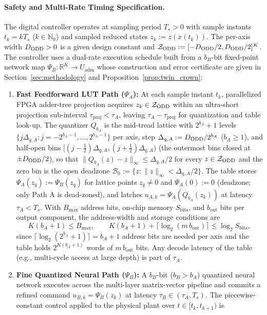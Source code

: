 \paragraph{Safety and Multi-Rate Timing Specification.}
The digital controller operates at sampling period \(T_s > 0\) with sample instants \(t_k = k T_s\) (\(k \in \mathbb{N}_0\)) and sampled reduced states \(z_k := z(x(t_k))\). The per-axis width \(D_{\mathrm{ODD}} > 0\) is a given design constant and \(\mathcal{Z}_{\mathrm{ODD}} := [-D_{\mathrm{ODD}}/2, D_{\mathrm{ODD}}/2]^K\). The controller uses a dual-rate execution schedule built from a \(b_B\)-bit fixed-point network map \(\Psi_B : \mathbb{R}^K \to U_{\mathrm{adm}}\) whose construction and error certificate are given in Section~\ref{sec:methodology} and Proposition~\ref{prop:twin_crown}:
\begin{enumerate}
    \item \textbf{Fast Feedforward LUT Path (\(\Psi_A\)):} At each sample instant \(t_k\), parallelized FPGA adder-tree projection acquires \(z_k \in \mathcal{Z}_{\mathrm{ODD}}\) within an ultra-short projection sub-interval \(\tau_{\mathrm{proj}} < \tau_A\), leaving \(\tau_A - \tau_{\mathrm{proj}}\) for quantization and table look-up. The quantizer \(Q_{b_A}\) is the mid-tread lattice with \(2^{b_A}+1\) levels \(\{j\Delta_{q,A} : j = -2^{b_A-1}, \dots, 2^{b_A-1}\}\) per axis, step \(\Delta_{q,A} := D_{\mathrm{ODD}}/2^{b_A}\) (\(b_A \ge 1\)), and half-open bins \([ (j-\tfrac12)\Delta_{q,A}, (j+\tfrac12)\Delta_{q,A})\) (the outermost bins closed at \(\pm D_{\mathrm{ODD}}/2\)), so that \(\|Q_{b_A}(z) - z\|_\infty \le \Delta_{q,A}/2\) for every \(z \in \mathcal{Z}_{\mathrm{ODD}}\) and the zero bin is the open deadzone \(\mathcal{B}_0 := \{z : \|z\|_\infty < \Delta_{q,A}/2\}\). The table stores \(\Psi_A(z_q) := \Psi_B(z_q)\) for lattice points \(z_q \neq 0\) and \(\Psi_A(0) := 0\) (deadzone; only Path A is dead-zoned), and latches \(u_{A,k} = \Psi_A(Q_{b_A}(z_k))\) at latency \(\tau_A < T_s\). With \(B_{\max}\) address bits, on-chip memory \(S_{\mathrm{bits}}\), and \(b_{\mathrm{out}}\) bits per output component, the address-width and storage conditions are
    \begin{equation}
    \label{eq:lut_capacity}
    K (b_A + 1) \le B_{\max}, \qquad K(b_A + 1) + \lceil \log_2(m\, b_{\mathrm{out}}) \rceil \le \log_2 S_{\mathrm{bits}} ,
    \end{equation}
    since \(\lceil\log_2(2^{b_A}+1)\rceil = b_A + 1\) address bits are needed per axis and the table holds \(2^{K(b_A+1)}\) words of \(m\,b_{\mathrm{out}}\) bits. Any decode latency of the table (e.g., multi-cycle access at large depth) is part of \(\tau_A\).
    \item \textbf{Fine Quantized Neural Path (\(\Psi_B\)):} A \(b_B\)-bit (\(b_B > b_A\)) quantized neural network executes across the multi-layer matrix-vector pipeline and commits a refined command \(u_{B,k} = \Psi_B(z_k)\) at latency \(\tau_B \in (\tau_A, T_s)\). The piecewise-constant control applied to the physical plant over \(t \in [t_k, t_{k+1})\) is

\end{enumerate}
